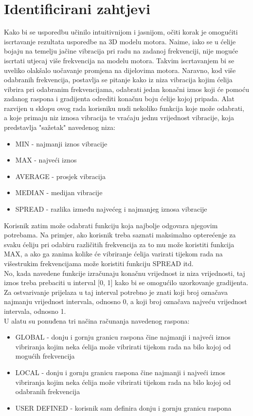 \documentclass[times, utf8, diplomski]{fer}
\begin{document}
\section{Identificirani zahtjevi} \label{requests-section}
Kako bi se usporedbu učinilo intuitivnijom i jasnijom, očiti korak je omogućiti iscrtavanje rezultata usporedbe na 3D modelu motora. Naime, iako se u \citep{matkovic2021getting} ćelije bojaju na temelju jačine vibracija pri radu na zadanoj frekvenciji, nije moguće iscrtati utjecaj više frekvencija na modelu motora. Takvim iscrtavanjem bi se uveliko olakšalo uočavanje promjena na dijelovima motora. Naravno, kod više odabranih frekvencija, postavlja se pitanje kako iz niza vibracija kojim ćelija vibrira pri odabranim frekvencijama, odabrati jedan konačni iznos koji će pomoću zadanog raspona i gradijenta odrediti konačnu boju ćelije kojoj pripada. Alat razvijen u sklopu ovog rada korisniku nudi nekoliko funkcija koje može odabrati, a koje primaju niz iznosa vibracija te vraćaju jednu vrijednost vibracije, koja predstavlja "sažetak" navedenog niza:

\begin{itemize}
\item MIN - najmanji iznos vibracije
\item MAX - najveći iznos 
\item AVERAGE - prosjek vibracija
\item MEDIAN - medijan vibracije
\item SPREAD - razlika između najvećeg i najmanjeg iznosa vibracije\\
\end{itemize}
Korisnik zatim može odabrati funkciju koja najbolje odgovara njegovim potrebama. Na primjer, ako korisnik treba saznati maksimalno opterećenje za svaku ćeliju pri odabiru različitih frekvencija za to mu može koristiti funkcija MAX, a ako ga zanima kolike će vibriranje ćelija varirati tijekom rada na višestrukim frekvencijama može koristiti funkciju SPREAD itd.
\\
No, kada navedene funkcije izračunaju konačnu vrijednost iz niza vrijednosti, taj iznos treba prebaciti u interval [0, 1] kako bi se omogućilo uzorkovanje gradijenta. Za ostvarivanje prijelaza u taj interval potrebno je znati koji broj označava najmanju vrijednost intervala, odnosno 0, a koji broj označava najveću vrijednost intervala, odnosno 1.
\\U alatu su ponuđena tri načina računanja navedenog raspona:

\begin{itemize}
\item GLOBAL - donju i gornju granicu raspona čine najmanji i najveći iznos vibriranja kojim neka ćelija može vibrirati tijekom rada na bilo kojoj od mogućih frekvencija
\item LOCAL - donju i gornju granicu raspona čine najmanji i najveći iznos vibriranja kojim neka ćelija može vibrirati tijekom rada na bilo kojoj od odabranih frekvencija
\item USER DEFINED - korisnik sam definira donju i gornju granicu raspona\\
\end{itemize}
\end{document}
